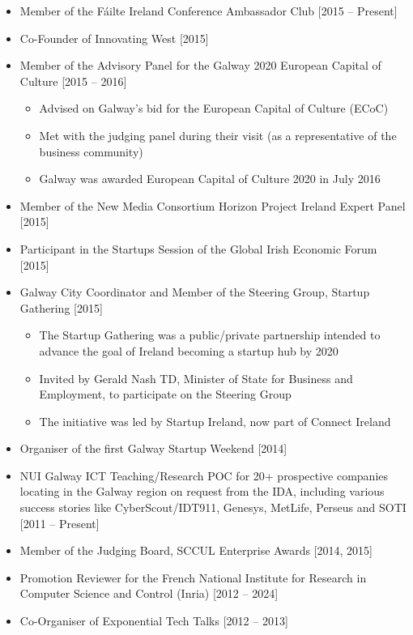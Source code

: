 \documentclass[10pt,a4paper]{res} %
\begin{document}
\begin{resume}
\begin{itemize}
\begin{itemize}
\end{itemize}
\item Member of the F\'{a}ilte Ireland Conference Ambassador Club [2015 -- Present]
\item Co-Founder of Innovating West [2015]
\item Member of the Advisory Panel for the Galway 2020 European Capital of Culture [2015 -- 2016]
\begin{itemize} \itemsep -2pt
\item Advised on Galway's bid for the European Capital of Culture (ECoC)
\item Met with the judging panel during their visit (as a representative of the business community)
\item Galway was awarded European Capital of Culture 2020 in July 2016
\end{itemize}
\item Member of the New Media Consortium Horizon Project Ireland Expert Panel [2015]
\item Participant in the Startups Session of the Global Irish Economic Forum [2015]
\item Galway City Coordinator and Member of the Steering Group, Startup Gathering [2015]
\begin{itemize} \itemsep -2pt
\item The Startup Gathering was a public/private partnership intended to advance the goal of Ireland becoming a startup hub by 2020
\item Invited by Gerald Nash TD, Minister of State for Business and Employment, to participate on the Steering Group
\item The initiative was led by Startup Ireland, now part of Connect Ireland
\end{itemize}
\item Organiser of the first Galway Startup Weekend [2014]
\item NUI Galway ICT Teaching/Research POC for 20+ prospective companies locating in the Galway region on request from the IDA, including various success stories like CyberScout/IDT911, Genesys, MetLife, Perseus and SOTI [2011 -- Present]
\item Member of the Judging Board, SCCUL Enterprise Awards [2014, 2015]
\item Promotion Reviewer for the French National Institute for Research in Computer Science and Control (Inria) [2012 -- 2024]
\item Co-Organiser of Exponential Tech Talks [2012 -- 2013]
\begin{itemize} \itemsep -2pt

\end{itemize}
\end{itemize}
\end{resume}
\end{document}
